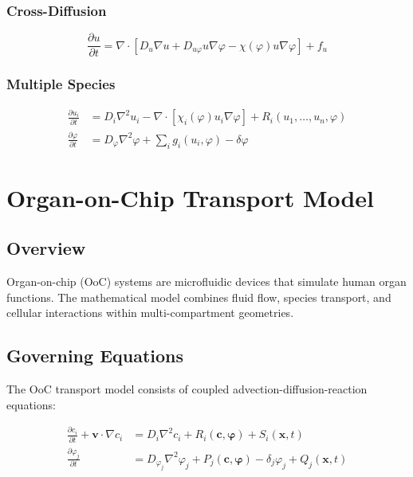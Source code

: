 \documentclass[11pt,a4paper]{article}
\begin{document}
\subsubsection{Cross-Diffusion}
\begin{equation}
\frac{\partial u}{\partial t} = \nabla \cdot \left[D_u\nabla u + D_{u\varphi}u\nabla\varphi - \chi(\varphi)u\nabla\varphi\right] + f_u
\end{equation}

\subsubsection{Multiple Species}
\begin{align}
\frac{\partial u_i}{\partial t} &= D_i\nabla^2 u_i - \nabla \cdot [\chi_i(\varphi)u_i\nabla\varphi] + R_i(u_1,\ldots,u_n,\varphi)\\
\frac{\partial \varphi}{\partial t} &= D_\varphi\nabla^2\varphi + \sum_i g_i(u_i,\varphi) - \delta\varphi
\end{align}

\section{Organ-on-Chip Transport Model}

\subsection{Overview}

Organ-on-chip (OoC) systems are microfluidic devices that simulate human organ functions. The mathematical model combines fluid flow, species transport, and cellular interactions within multi-compartment geometries.

\subsection{Governing Equations}

The OoC transport model consists of coupled advection-diffusion-reaction equations:

\begin{align}
\frac{\partial c_i}{\partial t} + \bm{v} \cdot \nabla c_i &= D_i \nabla^2 c_i + R_i(\bm{c},\bm{\varphi}) + S_i(\bm{x},t) \label{eq:ooc_transport}\\
\frac{\partial \varphi_j}{\partial t} &= D_{\varphi_j} \nabla^2 \varphi_j + P_j(\bm{c},\bm{\varphi}) - \delta_j \varphi_j + Q_j(\bm{x},t) \label{eq:ooc_signaling}
\end{align}
\end{document}
